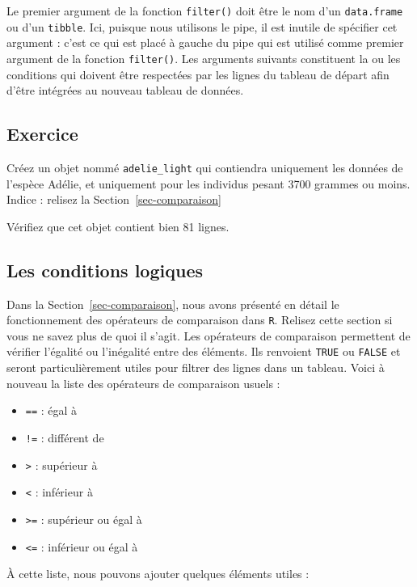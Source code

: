 \documentclass[
  a4paper,
  DIV=11,
  numbers=noendperiod,
  oneside]{scrreprt}
\providecommand{\tightlist}{%
  \setlength{\itemsep}{0pt}\setlength{\parskip}{0pt}}\usepackage{longtable,booktabs,array}
\begin{document}
Le premier argument de la fonction \texttt{filter()} doit être le nom
d'un \texttt{data.frame} ou d'un \texttt{tibble}. Ici, puisque nous
utilisons le pipe, il est inutile de spécifier cet argument : c'est ce
qui est placé à gauche du pipe qui est utilisé comme premier argument de
la fonction \texttt{filter()}. Les arguments suivants constituent la ou
les conditions qui doivent être respectées par les lignes du tableau de
départ afin d'être intégrées au nouveau tableau de données.

\subsection{Exercice}\label{exercice}

Créez un objet nommé \texttt{adelie\_light} qui contiendra uniquement
les données de l'espèce Adélie, et uniquement pour les individus pesant
3700 grammes ou moins. Indice : relisez la Section~\ref{sec-comparaison}

Vérifiez que cet objet contient bien 81 lignes.

\subsection{Les conditions logiques}\label{les-conditions-logiques}

Dans la Section~\ref{sec-comparaison}, nous avons présenté en détail le
fonctionnement des opérateurs de comparaison dans \texttt{R}. Relisez
cette section si vous ne savez plus de quoi il s'agit. Les opérateurs de
comparaison permettent de vérifier l'égalité ou l'inégalité entre des
éléments. Ils renvoient \texttt{TRUE} ou \texttt{FALSE} et seront
particulièrement utiles pour filtrer des lignes dans un tableau. Voici à
nouveau la liste des opérateurs de comparaison usuels :

\begin{itemize}
\tightlist
\item
  \texttt{==} : égal à
\item
  \texttt{!=} : différent de
\item
  \texttt{\textgreater{}} : supérieur à
\item
  \texttt{\textless{}} : inférieur à
\item
  \texttt{\textgreater{}=} : supérieur ou égal à
\item
  \texttt{\textless{}=} : inférieur ou égal à
\end{itemize}

À cette liste, nous pouvons ajouter quelques éléments utiles :
\end{document}
